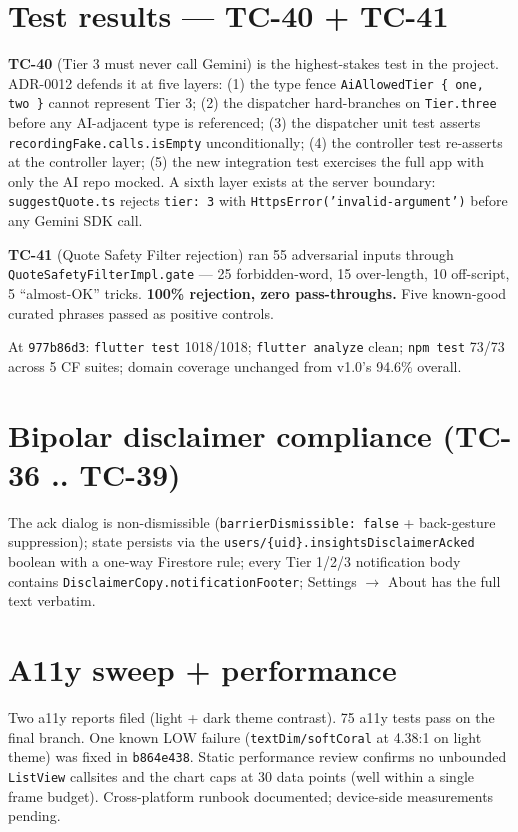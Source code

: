 \documentclass[11pt,a4paper]{article}
\begin{document}
\section{Test results --- TC-40 + TC-41}

\textbf{TC-40} (Tier 3 must never call Gemini) is the highest-stakes test
in the project. ADR-0012 defends it at five layers: (1) the type fence
\texttt{AiAllowedTier \{ one, two \}} cannot represent Tier 3; (2) the
dispatcher hard-branches on \texttt{Tier.three} before any AI-adjacent
type is referenced; (3) the dispatcher unit test asserts
\texttt{recordingFake.calls.isEmpty} unconditionally; (4) the controller
test re-asserts at the controller layer; (5) the new integration test
exercises the full app with only the AI repo mocked. A sixth layer
exists at the server boundary: \texttt{suggestQuote.ts} rejects
\texttt{tier: 3} with \texttt{HttpsError('invalid-argument')} before any
Gemini SDK call.

\textbf{TC-41} (Quote Safety Filter rejection) ran 55 adversarial
inputs through \texttt{QuoteSafetyFilterImpl.gate} --- 25 forbidden-word,
15 over-length, 10 off-script, 5 ``almost-OK'' tricks. \textbf{100\%
rejection, zero pass-throughs.} Five known-good curated phrases passed
as positive controls.

At \texttt{977b86d3}: \texttt{flutter test} 1018/1018; \texttt{flutter
analyze} clean; \texttt{npm test} 73/73 across 5 CF suites; domain
coverage unchanged from v1.0's 94.6\% overall.

\section{Bipolar disclaimer compliance (TC-36 .. TC-39)}

The ack dialog is non-dismissible (\texttt{barrierDismissible: false} +
back-gesture suppression); state persists via the
\texttt{users/\{uid\}.insightsDisclaimerAcked} boolean with a one-way
Firestore rule; every Tier 1/2/3 notification body contains
\texttt{DisclaimerCopy.notificationFooter}; Settings $\to$ About has the
full text verbatim.

\section{A11y sweep + performance}

Two a11y reports filed (light + dark theme contrast). 75 a11y tests
pass on the final branch. One known LOW failure
(\texttt{textDim/softCoral} at 4.38:1 on light theme) was fixed in
\texttt{b864e438}. Static performance review confirms no unbounded
\texttt{ListView} callsites and the chart caps at 30 data points (well
within a single frame budget). Cross-platform runbook documented;
device-side measurements pending.
\end{document}

